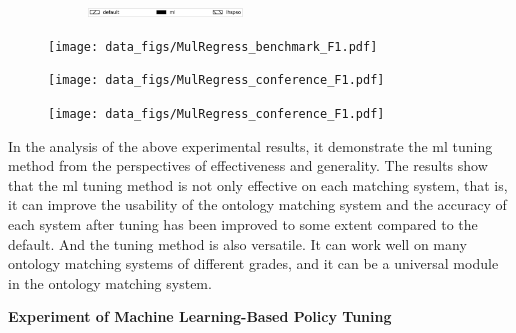 \documentclass[twoside]{article}
\begin{document}
\begin{figure}[htb!]\centering
\begin{subfigure}{\textwidth}
	\centering
	\includegraphics[width=0.45\textwidth]{figures/t_legend.pdf}
\end{subfigure}
\begin{minipage}{0.3\textwidth}
	\centering
	\texttt{[image: data\_figs/MulRegress\_benchmark\_F1.pdf]}
	\label{fig:MulRegress_benchmark_F1}
\end{minipage}
\begin{minipage}{0.3\textwidth}
	\centering
	\texttt{[image: data\_figs/MulRegress\_conference\_F1.pdf]}
	\label{fig:MulRegress_conference_F1}
\end{minipage}
\begin{minipage}{0.3\textwidth}
	\centering
	\texttt{[image: data\_figs/MulRegress\_conference\_F1.pdf]}
	\label{fig:MulRegress_anatomy_F1}
\end{minipage}
\end{figure}


In the analysis of the above experimental results, it demonstrate the ml tuning method from the perspectives of effectiveness and generality.
The results show that the ml tuning method is not only effective on each matching system, that is, it can improve the usability of the ontology matching system and the accuracy of each system after tuning has been improved to some extent compared to the default. And the tuning method is also versatile. It can work well on many ontology matching systems of different grades, and it can be a universal module in the ontology matching system.

{\bf Experiment of Machine Learning-Based Policy Tuning}
\end{document}

